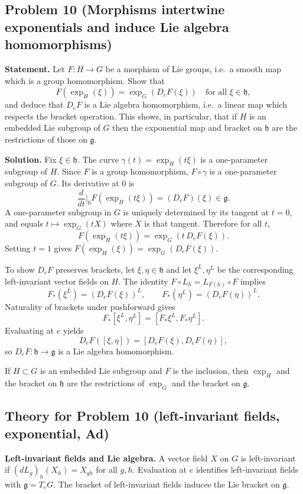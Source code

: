 \documentclass[12pt,a4paper]{article}
\theoremstyle{plain}
\theoremstyle{definition}      %
\begin{document}
\subsection*{Problem 10 (Morphisms intertwine exponentials and induce Lie algebra homomorphisms)}
\textbf{Statement.}
Let $F:H\to G$ be a morphism of Lie groups, i.e.\ a smooth map which is a group homomorphism.
Show that
\[
F(\exp_H(\xi))=\exp_G(D_eF(\xi))\quad\text{for all }\xi\in\mathfrak h,
\]
and deduce that $D_eF$ is a Lie algebra homomorphism, i.e.\ a linear map which respects the bracket operation.
This shows, in particular, that if $H$ is an embedded Lie subgroup of $G$ then the exponential map and bracket
on $\mathfrak h$ are the restrictions of those on $\mathfrak g$.

\textbf{Solution.}
Fix $\xi\in\mathfrak h$. The curve $\gamma(t)=\exp_H(t\xi)$ is a one-parameter subgroup of $H$.
Since $F$ is a group homomorphism, $F\circ\gamma$ is a one-parameter subgroup of $G$.
Its derivative at $0$ is
\[
\frac{d}{dt}\Big|_{0}F(\exp_H(t\xi))=(D_eF)(\xi)\in\mathfrak g.
\]
A one-parameter subgroup in $G$ is uniquely determined by its tangent at $t=0$, and equals
$t\mapsto \exp_G(tX)$ where $X$ is that tangent. Therefore for all $t$,
\[
F(\exp_H(t\xi))=\exp_G(t\,D_eF(\xi)).
\]
Setting $t=1$ gives $F(\exp_H(\xi))=\exp_G(D_eF(\xi))$.

To show $D_eF$ preserves brackets, let $\xi,\eta\in\mathfrak h$ and let $\xi^L,\eta^L$ be the corresponding
left-invariant vector fields on $H$. The identity $F\circ L_h=L_{F(h)}\circ F$ implies
\[
F_*(\xi^L)=(D_eF(\xi))^L,\qquad F_*(\eta^L)=(D_eF(\eta))^L.
\]
Naturality of brackets under pushforward gives
\[
F_*[\xi^L,\eta^L]=[F_*\xi^L,F_*\eta^L].
\]
Evaluating at $e$ yields
\[
D_eF([\xi,\eta])=[D_eF(\xi),D_eF(\eta)],
\]
so $D_eF:\mathfrak h\to\mathfrak g$ is a Lie algebra homomorphism.

If $H\subset G$ is an embedded Lie subgroup and $F$ is the inclusion, then $\exp_H$ and the bracket on
$\mathfrak h$ are the restrictions of $\exp_G$ and the bracket on $\mathfrak g$.

\subsection*{Theory for Problem 10 (left-invariant fields, exponential, Ad)}

\textbf{Left-invariant fields and Lie algebra.}
A vector field $X$ on $G$ is left-invariant if $(dL_g)_h(X_h)=X_{gh}$ for all $g,h$.
Evaluation at $e$ identifies left-invariant fields with $\mathfrak g=T_eG$.
The bracket of left-invariant fields induces the Lie bracket on $\mathfrak g$.
\end{document}
